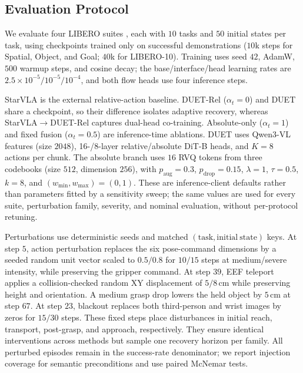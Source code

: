 \documentclass[letterpaper, 10 pt, conference]{ieeeconf}
\begin{document}
\subsection{Evaluation Protocol}
\label{sec:protocol}
We evaluate four LIBERO suites \cite{libero}, each with $10$ tasks and $50$ initial states per task, using checkpoints trained only on successful demonstrations ($10$k steps for Spatial, Object, and Goal; $40$k for LIBERO-10). Training uses seed $42$, AdamW, $500$ warmup steps, and cosine decay; the base/interface/head learning rates are $2.5{\times}10^{-5}/10^{-5}/10^{-4}$, and both flow heads use four inference steps.

StarVLA \cite{starvla} is the external relative-action baseline. DUET-Rel ($\alpha_t{=}0$) and DUET share a checkpoint, so their difference isolates adaptive recovery, whereas StarVLA$\to$DUET-Rel captures dual-head co-training. Absolute-only ($\alpha_t{=}1$) and fixed fusion ($\alpha_t{=}0.5$) are inference-time ablations. DUET uses Qwen3-VL features (size $2048$), 16-/8-layer relative/absolute DiT-B heads, and $K{=}8$ actions per chunk. The absolute branch uses $16$ RVQ tokens from three codebooks (size $512$, dimension $256$), with $p_{\mathrm{aug}}{=}0.3$, $p_{\mathrm{drop}}{=}0.15$, $\lambda{=}1$, $\tau{=}0.5$, $k{=}8$, and $(w_{\min},w_{\max}){=}(0,1)$. These are inference-client defaults rather than parameters fitted by a sensitivity sweep; the same values are used for every suite, perturbation family, severity, and nominal evaluation, without per-protocol retuning.

Perturbations use deterministic seeds and matched $(\mathrm{task},\mathrm{initial\ state})$ keys. At step $5$, action perturbation replaces the six pose-command dimensions by a seeded random unit vector scaled to $0.5/0.8$ for $10/15$ steps at medium/severe intensity, while preserving the gripper command. At step $39$, EEF teleport applies a collision-checked random XY displacement of $5/8$\,cm while preserving height and orientation. A medium grasp drop lowers the held object by $5$\,cm at step $67$. At step $23$, blackout replaces both third-person and wrist images by zeros for $15/30$ steps. These fixed steps place disturbances in initial reach, transport, post-grasp, and approach, respectively. They ensure identical interventions across methods but sample one recovery horizon per family. All perturbed episodes remain in the success-rate denominator; we report injection coverage for semantic preconditions and use paired McNemar tests.
\end{document}
